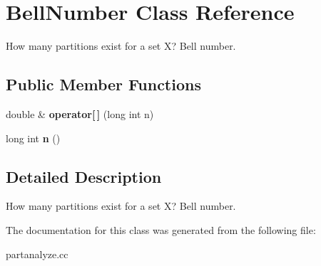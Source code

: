 \section{Bell\-Number Class Reference}
\label{classBellNumber}
How many partitions exist for a set X? Bell number.  


\subsection*{Public Member Functions}
\begin{CompactItemize}
\item 
double \& {\bf operator[$\,$]} (long int n)\label{classBellNumber_a1}

\item 
long int {\bf n} ()\label{classBellNumber_a2}

\end{CompactItemize}


\subsection{Detailed Description}
How many partitions exist for a set X? Bell number. 



The documentation for this class was generated from the following file:\begin{CompactItemize}
\item 
partanalyze.cc\end{CompactItemize}
